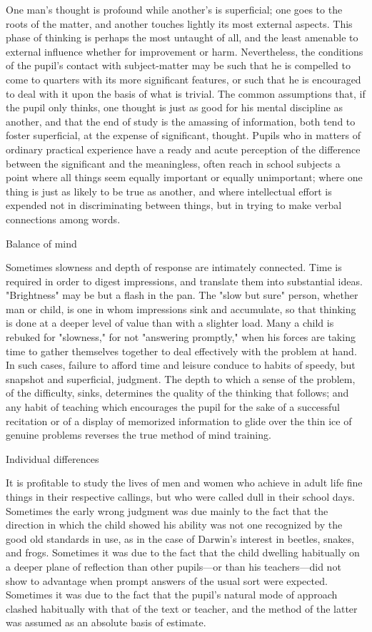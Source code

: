 \documentclass[letterpaper]{book}
\begin{document}
One man's thought is profound while another's is superficial; one goes
to the roots of the matter, and another touches lightly its most
external aspects. This phase of thinking is perhaps the most untaught of
all, and the least amenable to external influence whether for
improvement or harm. Nevertheless, the conditions of the pupil's contact
with subject-matter may be such that he is compelled to come to quarters
with its more significant features, or such that he is encouraged to
deal with it upon the basis of what is trivial. The common assumptions
that, if the pupil only thinks, one thought is just as good for his
mental discipline as another, and that the end of study is the amassing
of information, both tend to foster superficial, at the expense of
significant, thought. Pupils who in matters of ordinary practical
experience have a ready and acute perception of the difference between
the significant and the meaningless, often reach in school subjects a
point where all things seem equally important or equally unimportant;
where one thing is just as likely to be true as another, and where
intellectual effort is expended not in discriminating between things,
but in trying to make verbal connections among words.

Balance of mind

Sometimes slowness and depth of response are intimately connected. Time
is required in order to digest impressions, and translate them into
substantial ideas. "Brightness" may be but a flash in the pan. The "slow
but sure" person, whether man or child, is one in whom impressions sink
and accumulate, so that thinking is
done
at a deeper level of value than with a slighter load. Many a child is
rebuked for "slowness," for not "answering promptly," when his forces
are taking time to gather themselves together to deal effectively with
the problem at hand. In such cases, failure to afford time and leisure
conduce to habits of speedy, but snapshot and superficial, judgment. The
depth to which a sense of the problem, of the difficulty, sinks,
determines the quality of the thinking that follows; and any habit of
teaching which encourages the pupil for the sake of a successful
recitation or of a display of memorized information to glide over the
thin ice of genuine problems reverses the true method of mind training.

Individual differences

It is profitable to study the lives of men and women who achieve in
adult life fine things in their respective callings, but who were called
dull in their school days. Sometimes the early wrong judgment was due
mainly to the fact that the direction in which the child showed his
ability was not one recognized by the good old standards in use, as in
the case of Darwin's interest in beetles, snakes, and frogs. Sometimes
it was due to the fact that the child dwelling habitually on a deeper
plane of reflection than other pupils---or than his teachers---did not
show to advantage when prompt answers of the usual sort were expected.
Sometimes it was due to the fact that the pupil's natural mode of
approach clashed habitually with that of the text or teacher, and the
method of the latter was assumed as an absolute basis of estimate.
\end{document}
